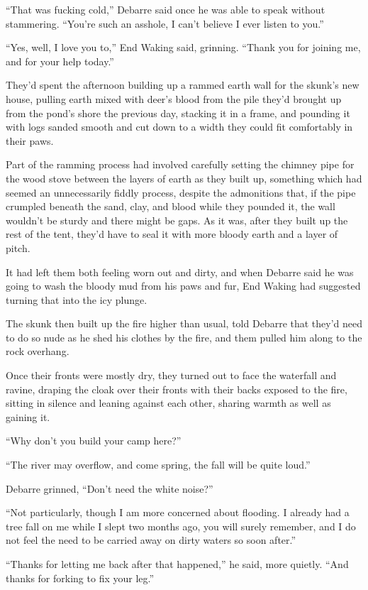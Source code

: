 ``That was fucking cold,'' Debarre said once he was able to speak without stammering. ``You're such an asshole, I can't believe I ever listen to you.''

``Yes, well, I love you to,'' End Waking said, grinning. ``Thank you for joining me, and for your help today.''

They'd spent the afternoon building up a rammed earth wall for the skunk's new house, pulling earth mixed with deer's blood from the pile they'd brought up from the pond's shore the previous day, stacking it in a frame, and pounding it with logs sanded smooth and cut down to a width they could fit comfortably in their paws.

Part of the ramming process had involved carefully setting the chimney pipe for the wood stove between the layers of earth as they built up, something which had seemed an unnecessarily fiddly process, despite the admonitions that, if the pipe crumpled beneath the sand, clay, and blood while they pounded it, the wall wouldn't be sturdy and there might be gaps. As it was, after they built up the rest of the tent, they'd have to seal it with more bloody earth and a layer of pitch.

It had left them both feeling worn out and dirty, and when Debarre said he was going to wash the bloody mud from his paws and fur, End Waking had suggested turning that into the icy plunge.

The skunk then built up the fire higher than usual, told Debarre that they'd need to do so nude as he shed his clothes by the fire, and them pulled him along to the rock overhang.

Once their fronts were mostly dry, they turned out to face the waterfall and ravine, draping the cloak over their fronts with their backs exposed to the fire, sitting in silence and leaning against each other, sharing warmth as well as gaining it.

``Why don't you build your camp here?''

``The river may overflow, and come spring, the fall will be quite loud.''

Debarre grinned, ``Don't need the white noise?''

``Not particularly, though I am more concerned about flooding. I already had a tree fall on me while I slept two months ago, you will surely remember, and I do not feel the need to be carried away on dirty waters so soon after.''

``Thanks for letting me back after that happened,'' he said, more quietly. ``And thanks for forking to fix your leg.''

